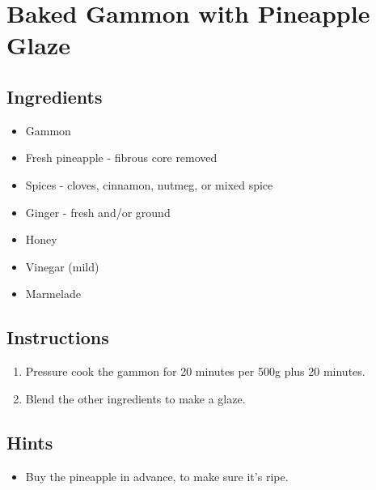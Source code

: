 \section{Baked Gammon with Pineapple Glaze}
\subsection*{Ingredients}
\begin{itemize}
    \item Gammon
    \item Fresh pineapple - fibrous core removed
    \item Spices - cloves, cinnamon, nutmeg, or mixed spice
    \item Ginger - fresh and/or ground
    \item Honey
    \item Vinegar (mild)
    \item Marmelade
\end{itemize}

\subsection*{Instructions}
\begin{enumerate}
    \item Pressure cook the gammon for 20 minutes per 500g plus 20 minutes.
    \item Blend the other ingredients to make a glaze.
\end{enumerate}

\subsection*{Hints}
\begin{itemize}
    \item Buy the pineapple in advance, to make sure it's ripe.
\end{itemize}
\newpage